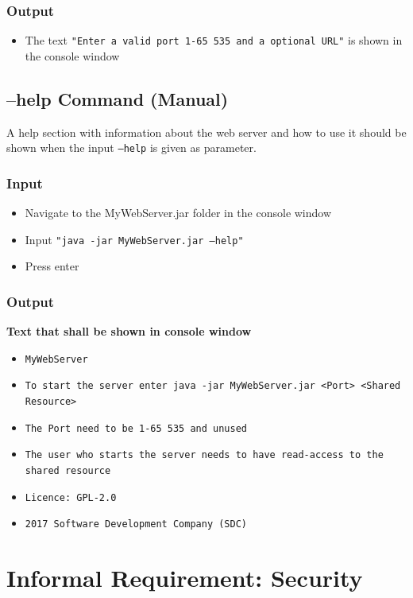 \documentclass[a4paper, 12pt]{article}
\begin{document}
\subsubsection{Output} 
\begin{itemize}
\item The text \texttt{"Enter a valid port 1-65 535 and a optional URL"} is shown in the console window
\end{itemize}

\subsection{--help Command (Manual)}

A help section with information about the web server and how to use it should be shown when the input \texttt{--help} is given as parameter.

\subsubsection{Input}
\begin{itemize}
\item Navigate to the MyWebServer.jar folder in the console window
\item Input \texttt{"java -jar MyWebServer.jar --help"}
\item Press enter
\end{itemize} 

\subsubsection{Output}
\textbf{Text that shall be shown in console window}
\begin{itemize}
\item \texttt{MyWebServer}
\item \texttt{To start the server enter java -jar MyWebServer.jar <Port> <Shared Resource>}
\item \texttt{The Port need to be 1-65 535 and unused}
\item \texttt{The user who starts the server needs to have read-access to the shared resource}
\item \texttt{Licence: GPL-2.0}
\item \texttt{2017 Software Development Company (SDC)}
\end{itemize}

\section{Informal Requirement: Security}
\end{document}
